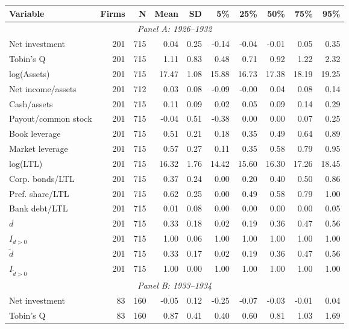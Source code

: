 \begin{threeparttable}
\begin{tabular}{lrrrrrrrrr}
\toprule
Variable & Firms & N & Mean & SD & 5\% & 25\% & 50\% & 75\% & 95\% \\
\midrule
\multicolumn{10}{c}{\textit{Panel A: 1926--1932}} \\
\midrule
Net investment & 201 & 715 & 0.04 & 0.25 & -0.14 & -0.04 & -0.01 & 0.05 & 0.35 \\
Tobin's Q & 201 & 715 & 1.11 & 0.83 & 0.48 & 0.71 & 0.92 & 1.22 & 2.32 \\
log(Assets) & 201 & 715 & 17.47 & 1.08 & 15.88 & 16.73 & 17.38 & 18.19 & 19.25 \\
Net income/assets & 201 & 712 & 0.03 & 0.08 & -0.09 & -0.00 & 0.04 & 0.08 & 0.14 \\
Cash/assets & 201 & 715 & 0.11 & 0.09 & 0.02 & 0.05 & 0.09 & 0.14 & 0.29 \\
Payout/common stock & 201 & 715 & -0.04 & 0.51 & -0.38 & 0.00 & 0.00 & 0.07 & 0.25 \\
Book leverage & 201 & 715 & 0.51 & 0.21 & 0.18 & 0.35 & 0.49 & 0.64 & 0.89 \\
Market leverage & 201 & 715 & 0.57 & 0.27 & 0.11 & 0.35 & 0.58 & 0.79 & 0.95 \\
log(LTL) & 201 & 715 & 16.32 & 1.76 & 14.42 & 15.60 & 16.30 & 17.26 & 18.45 \\
Corp. bonds/LTL & 201 & 715 & 0.37 & 0.24 & 0.00 & 0.20 & 0.40 & 0.50 & 0.86 \\
Pref. share/LTL & 201 & 715 & 0.62 & 0.25 & 0.00 & 0.49 & 0.58 & 0.79 & 1.00 \\
Bank debt/LTL & 201 & 715 & 0.01 & 0.08 & 0.00 & 0.00 & 0.00 & 0.00 & 0.05 \\
\ensuremath{d} & 201 & 715 & 0.33 & 0.18 & 0.02 & 0.19 & 0.36 & 0.47 & 0.56 \\
\ensuremath{I_{d>0}} & 201 & 715 & 1.00 & 0.06 & 1.00 & 1.00 & 1.00 & 1.00 & 1.00 \\
\ensuremath{\tilde{d}} & 201 & 715 & 0.33 & 0.17 & 0.02 & 0.19 & 0.36 & 0.47 & 0.56 \\
\ensuremath{I_{\tilde{d}>0}} & 201 & 715 & 1.00 & 0.00 & 1.00 & 1.00 & 1.00 & 1.00 & 1.00 \\
\midrule
\multicolumn{10}{c}{\textit{Panel B: 1933--1934}} \\
\midrule
Net investment & 83 & 160 & -0.05 & 0.12 & -0.25 & -0.07 & -0.03 & -0.01 & 0.04 \\
Tobin's Q & 83 & 160 & 0.87 & 0.41 & 0.40 & 0.60 & 0.81 & 1.03 & 1.69 \\

\end{tabular}
\end{threeparttable}
